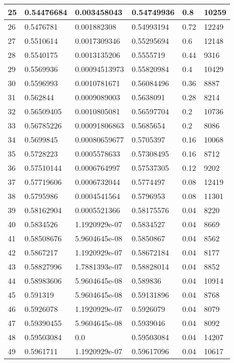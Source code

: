 \begin{longtable}{|l|l|l|l|l|l|}
25 & 0.54476684 & 0.003458043 & 0.54749936 & 0.8 & 10259 \\ \hline 
26 & 0.5476781 & 0.001882308 & 0.54993194 & 0.72 & 12249 \\ \hline 
27 & 0.5510614 & 0.0017309346 & 0.55295694 & 0.6 & 12148 \\ \hline 
28 & 0.5540175 & 0.0013135206 & 0.5555719 & 0.44 & 9316 \\ \hline 
29 & 0.5569936 & 0.00094513973 & 0.55820984 & 0.4 & 10429 \\ \hline 
30 & 0.5596993 & 0.0010781671 & 0.56084496 & 0.36 & 8887 \\ \hline 
31 & 0.562844 & 0.0009089003 & 0.5638091 & 0.28 & 8214 \\ \hline 
32 & 0.56509405 & 0.0010805081 & 0.56597704 & 0.2 & 10736 \\ \hline 
33 & 0.56785226 & 0.00091806863 & 0.5685654 & 0.2 & 8086 \\ \hline 
34 & 0.5699845 & 0.00080659677 & 0.5705397 & 0.16 & 10068 \\ \hline 
35 & 0.5728223 & 0.0005578633 & 0.57308495 & 0.16 & 8712 \\ \hline 
36 & 0.57510144 & 0.0006764997 & 0.57537305 & 0.12 & 9202 \\ \hline 
37 & 0.57719606 & 0.0006732044 & 0.5774497 & 0.08 & 12419 \\ \hline 
38 & 0.5795986 & 0.0004541564 & 0.5796953 & 0.08 & 11301 \\ \hline 
39 & 0.58162904 & 0.0005521366 & 0.58175576 & 0.04 & 8220 \\ \hline 
40 & 0.5834526 & 1.1920929e-07 & 0.5834527 & 0.04 & 8669 \\ \hline 
41 & 0.58508676 & 5.9604645e-08 & 0.5850867 & 0.04 & 8562 \\ \hline 
42 & 0.5867217 & 1.1920929e-07 & 0.58672184 & 0.04 & 8177 \\ \hline 
43 & 0.58827996 & 1.7881393e-07 & 0.58828014 & 0.04 & 8852 \\ \hline 
44 & 0.58983606 & 5.9604645e-08 & 0.589836 & 0.04 & 10914 \\ \hline 
45 & 0.591319 & 5.9604645e-08 & 0.59131896 & 0.04 & 8768 \\ \hline 
46 & 0.5926078 & 1.1920929e-07 & 0.5926079 & 0.04 & 8079 \\ \hline 
47 & 0.59390455 & 5.9604645e-08 & 0.5939046 & 0.04 & 8092 \\ \hline 
48 & 0.59503084 & 0.0 & 0.59503084 & 0.04 & 14207 \\ \hline 
49 & 0.5961711 & 1.1920929e-07 & 0.59617096 & 0.04 & 10617 \\ \hline 

\end{longtable}
